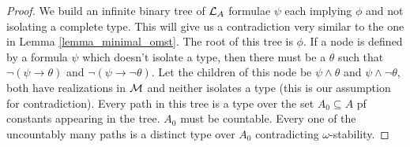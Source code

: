 \begin{proof}
We build an infinite binary tree of \(\mathcal{L}_A\) formulae \(\psi\) each implying \(\phi\) and not isolating a complete type.
This will give us a contradiction very similar to the one in Lemma \ref{lemma_minimal_omst}.
The root of this tree is \(\phi\).
If a node is defined by a formula \(\psi\) which doesn't isolate a type, then there must be a \(\theta\) such that \(\neg(\psi \to \theta)\) and \(\neg(\psi \to \neg \theta)\). 
Let the children of this node be \(\psi \land \theta\) and \(\psi \land \neg \theta\), both have realizations in \(\mathcal{M}\) and neither isolates a type (this is our assumption for contradiction).
Every path in this tree is a type over the set \(A_0 \subseteq A\) pf constants appearing in the tree. 
\(A_0\) must be countable. 
Every one of the uncountably many paths is a distinct type over \(A_0\) contradicting \(\omega\)-stability. 
\end{proof}

